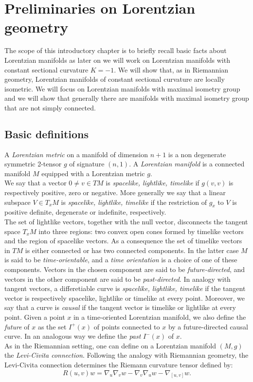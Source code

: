 \chapter{Preliminaries on Lorentzian geometry}

The scope of this introductory chapter is to briefly recall basic facts about Lorentzian manifolds as later on we will work on Lorentzian manifolds with constant sectional curvature $K=-1$.
We will show that, as in Riemannian geometry, Lorentzian manifolds of constant sectional curvature are locally isometric. We will focus on Lorentzian manifolds with maximal isometry group and we will show that generally there are manifolds with maximal isometry group that are not simply connected.
\section{Basic definitions}
A \textit{Lorentzian metric} on a manifold of dimension $n+1$ is a non degenerate symmetric 2-tensor $g$ of signature $(n,1)$.
A \textit{Lorentzian manifold} is a connected manifold $M$ equipped with a Lorentzian metric $g$.\\
We say that a vector $0\neq v \in TM$ is \textit{spacelike, lightlike, timelike} if $g(v,v)$ is respectively positive, zero or negative.
More generally we say that a linear subspace $V \in T_x M$ is \textit{spacelike, lightlike, timelike} if the restriction of $g_x$ to $V$ is positive definite, degenerate or indefinite, respectively.\\
The set of lightlike vectors, together with the null vector, disconnects the tangent space $T_x M$ into three regions: two convex open cones formed by timelike vectors and the region of spacelike vectors.
As a consequence the set of timelike vectors in $TM$ is either connected or has two connected components.
In the latter case $M$ is said to be \textit{time-orientable}, and a \textit{time orientation} is a choice of one of these components.
Vectors in the chosen component are said to be \textit{future-directed}, and vectors in the other component are said to be \textit{past-directed}.
In analogy with tangent vectors, a differetiable curve is \textit{spacelike, lightlike, timelike} if the tangent vector is respectively spacelike, lightlike or timelike at every point. Moreover, we say that a curve is \textit{causal} if the tangent vector is timelike or lightlike at every point.  Given a point $x$ in a time-oriented Lorentzian manifold, we also define the \textit{future} of $x$ as the set $I^+(x)$ of points connected to $x$ by a future-directed causal curve. In an analogous way we define the \textit{past} $I^-(x)$ of $x$.\\
As in the Riemannian setting, one can define on a Lorentzian manifold $(M,g)$ the \textit{Levi-Civita connection}. Following the analogy with Riemannian geometry, the Levi-Civita connection determines the Riemann curvature tensor defined by: 
\[
    R(u,v)w=\nabla_u\nabla_v w-\nabla_v\nabla_u w-\nabla_{[u,v]}w.
\]  

